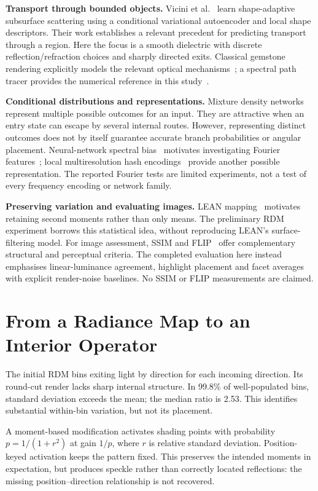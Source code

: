 \documentclass[conference]{IEEEtran}
\begin{document}
\textbf{Transport through bounded objects.} Vicini et
al.~\cite{vicini2019} learn shape-adaptive subsurface scattering using a
conditional variational autoencoder and local shape descriptors. Their work
establishes a relevant precedent for predicting transport through a region.
Here the focus is a smooth dielectric with discrete reflection/refraction
choices and sharply directed exits. Classical gemstone rendering explicitly
models the relevant optical mechanisms~\cite{sun2000}; a spectral path tracer
provides the numerical reference in this study~\cite{pharr2023,wilkie2014}.

\textbf{Conditional distributions and representations.} Mixture density
networks~\cite{bishop1994} represent multiple possible outcomes for an input.
They are attractive when an entry state can escape by several internal routes.
However, representing distinct outcomes does not by itself guarantee accurate
branch probabilities or angular placement. Neural-network spectral
bias~\cite{rahaman2019} motivates investigating Fourier
features~\cite{tancik2020}; local multiresolution hash
encodings~\cite{muller2022ngp} provide another possible representation. The
reported Fourier tests are limited experiments, not a test of every frequency
encoding or network family.

\textbf{Preserving variation and evaluating images.} LEAN
mapping~\cite{olano2010} motivates retaining second moments rather than only
means. The preliminary RDM experiment borrows this statistical idea, without
reproducing LEAN's surface-filtering model. For image assessment, SSIM and
FLIP~\cite{wang2004,andersson2020} offer complementary structural and perceptual
criteria. The completed evaluation here instead emphasises linear-luminance
agreement, highlight placement and facet averages with explicit render-noise
baselines. No SSIM or FLIP measurements are claimed.

\section{From a Radiance Map to an Interior Operator}
\label{sec:rdm}
The initial RDM bins exiting light by direction for each incoming direction.
Its round-cut render lacks sharp internal structure. In 99.8\% of
well-populated bins, standard deviation exceeds the mean; the median ratio is
2.53. This identifies substantial within-bin variation, but not its placement.

A moment-based modification activates shading points with probability
$p=1/(1+r^2)$ at gain $1/p$, where $r$ is relative standard deviation.
Position-keyed activation keeps the pattern fixed. This preserves the intended
moments in expectation, but produces speckle rather than correctly located
reflections: the missing position--direction relationship is not recovered.
\end{document}
